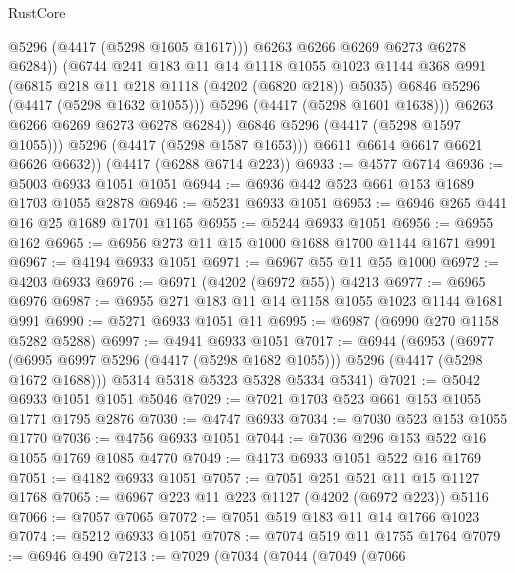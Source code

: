\begin{lexlean}{RustCore}
\begin{coremodule}
                        @5296
                        (@4417 (@5298 @1605 @1617)))
                      @6263
                      @6266
                      @6269
                      @6273
                      @6278
                      @6284))
                  (@6744
                    @241
                    @183
                    @11
                    @14
                    @1118
                    @1055
                    @1023
                    @1144
                    @368
                    @991
                    (@6815 @218 @11 @218 @1118 (@4202 (@6820 @218)) @5035)
                    @6846
                    @5296
                    (@4417 (@5298 @1632 @1055)))
                  @5296
                  (@4417 (@5298 @1601 @1638)))
                @6263
                @6266
                @6269
                @6273
                @6278
                @6284))
            @6846
            @5296
            (@4417 (@5298 @1597 @1055)))
          @5296
          (@4417 (@5298 @1587 @1653)))
        @6611
        @6614
        @6617
        @6621
        @6626
        @6632))
    (@4417 (@6288 @6714 @223))
@6933 := @4577 @6714
@6936 := @5003 @6933 @1051 @1051
@6944 := @6936 @442 @523 @661 @153 @1689 @1703 @1055 @2878
@6946 := @5231 @6933 @1051
@6953 := @6946 @265 @441 @16 @25 @1689 @1701 @1165
@6955 := @5244 @6933 @1051
@6956 := @6955 @162
@6965 := @6956 @273 @11 @15 @1000 @1688 @1700 @1144 @1671 @991
@6967 := @4194 @6933 @1051
@6971 := @6967 @55 @11 @55 @1000
@6972 := @4203 @6933
@6976 := @6971 (@4202 (@6972 @55)) @4213
@6977 := @6965 @6976
@6987 := @6955 @271 @183 @11 @14 @1158 @1055 @1023 @1144 @1681 @991
@6990 := @5271 @6933 @1051 @11
@6995 := @6987 (@6990 @270 @1158 @5282 @5288)
@6997 := @4941 @6933 @1051
@7017 := @6944
    (@6953
      (@6977 (@6995 @6997 @5296 (@4417 (@5298 @1682 @1055))) @5296 (@4417 (@5298 @1672 @1688)))
      @5314
      @5318
      @5323
      @5328
      @5334
      @5341)
@7021 := @5042 @6933 @1051 @1051 @5046
@7029 := @7021 @1703 @523 @661 @153 @1055 @1771 @1795 @2876
@7030 := @4747 @6933
@7034 := @7030 @523 @153 @1055 @1770
@7036 := @4756 @6933 @1051
@7044 := @7036 @296 @153 @522 @16 @1055 @1769 @1085 @4770
@7049 := @4173 @6933 @1051 @522 @16 @1769
@7051 := @4182 @6933 @1051
@7057 := @7051 @251 @521 @11 @15 @1127 @1768
@7065 := @6967 @223 @11 @223 @1127 (@4202 (@6972 @223)) @5116
@7066 := @7057 @7065
@7072 := @7051 @519 @183 @11 @14 @1766 @1023
@7074 := @5212 @6933 @1051
@7078 := @7074 @519 @11 @1755 @1764
@7079 := @6946 @490
@7213 := @7029
    (@7034
      (@7044
        (@7049
          (@7066

\end{coremodule}
\end{lexlean}
